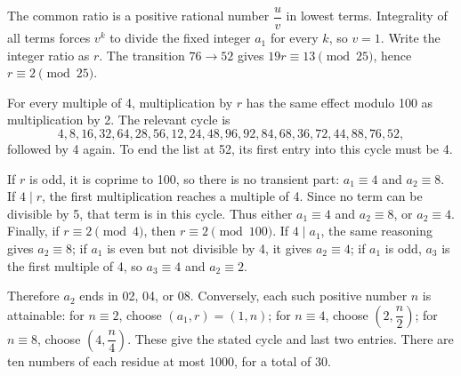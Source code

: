 The common ratio is a positive rational number $\dfrac{u}{v}$ in lowest terms. Integrality of all terms forces $v^k$ to divide the fixed integer $a_1$ for every $k$, so $v=1$. Write the integer ratio as $r$. The transition $76\to52$ gives $19r\equiv13\pmod{25}$, hence $r\equiv2\pmod{25}$.

For every multiple of 4, multiplication by $r$ has the same effect modulo 100 as multiplication by 2. The relevant cycle is
\[4,8,16,32,64,28,56,12,24,48,96,92,84,68,36,72,44,88,76,52,\]
followed by 4 again. To end the list at 52, its first entry into this cycle must be 4.

If $r$ is odd, it is coprime to 100, so there is no transient part: $a_1\equiv4$ and $a_2\equiv8$. If $4\mid r$, the first multiplication reaches a multiple of 4. Since no term can be divisible by 5, that term is in this cycle. Thus either $a_1\equiv4$ and $a_2\equiv8$, or $a_2\equiv4$. Finally, if $r\equiv2\pmod4$, then $r\equiv2\pmod{100}$. If $4\mid a_1$, the same reasoning gives $a_2\equiv8$; if $a_1$ is even but not divisible by 4, it gives $a_2\equiv4$; if $a_1$ is odd, $a_3$ is the first multiple of 4, so $a_3\equiv4$ and $a_2\equiv2$.

Therefore $a_2$ ends in 02, 04, or 08. Conversely, each such positive number $n$ is attainable: for $n\equiv2$, choose $(a_1,r)=(1,n)$; for $n\equiv4$, choose $(2,\dfrac{n}{2})$; for $n\equiv8$, choose $(4,\dfrac{n}{4})$. These give the stated cycle and last two entries. There are ten numbers of each residue at most 1000, for a total of $\boxed{30}$.
